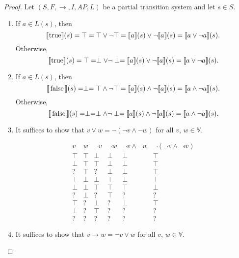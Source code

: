 \documentclass[12pt]{article}
\newcommand{\TRUE}{\mbox{\lstinline{true}}}
\newcommand{\FALSE}{\mbox{\lstinline{false}}}
\theoremstyle{definition}
\newcommand{\satisfaction}[1]{\llbracket #1 \rrbracket}
\begin{document}
\begin{proof}
Let $(S, F, \rightarrow, I, \mathit{AP}, L)$ be a partial transition system and let $s \in S$.
\begin{enumerate}
\item 
If $a \in L(s)$, then
\[
\satisfaction{\TRUE}(s) = \top = \top \vee \neg \top = \satisfaction{a}(s) \vee \neg \satisfaction{a}(s) = \satisfaction{a \vee \neg a}(s).
\]
Otherwise,
\[
\satisfaction{\TRUE}(s) = \top = \perp \vee \neg \perp = \satisfaction{a}(s) \vee \neg \satisfaction{a}(s) = \satisfaction{a \vee \neg a}(s).
\]
\item
If $a \in L(s)$, then
\[
\satisfaction{\FALSE}(s) = \perp = \top \wedge \neg \top = \satisfaction{a}(s) \wedge \neg \satisfaction{a}(s) = \satisfaction{a \wedge \neg a}(s).
\]
Otherwise,
\[
\satisfaction{\FALSE}(s) = \perp = \perp \wedge \neg \perp = \satisfaction{a}(s) \wedge \neg \satisfaction{a}(s) = \satisfaction{a \wedge \neg a}(s).
\]
\item
It suffices to show that $v \vee w = \neg(\neg v \wedge \neg w)$ for all $v$, $w \in \mathbb{V}$.

\[
\begin{array}{ll|lll|l}
v     & w     & \neg v & \neg w & \neg v \wedge \neg w & \neg(\neg v \wedge \neg w)\\\hline
\top  & \top  & \perp  & \perp  & \perp                & \top\\
\perp & \top  & \top   & \perp  & \perp                & \top\\
?     & \top  & ?      & \perp  & \perp                & \top\\
\top  & \perp & \perp  & \top   & \perp                & \top\\
\perp & \perp & \top   & \top   & \top                 & \perp\\
?     & \perp & ?      & \top   & ?                    & ?\\
\top  & ?     & \perp  & ?      & \perp                & \top\\
\perp & ?     & \top   & ?      & ?                    & ?\\
?     & ?     & ?      & ?      & ?                    & ?
\end{array}
\]
\item
It suffices to show that $v \rightarrow w = \neg v \vee w$ for all $v$, $w \in \mathbb{V}$.


\end{enumerate}
\end{proof}
\end{document}
